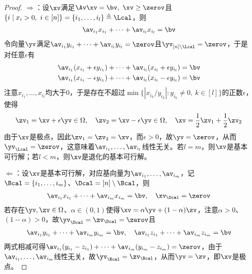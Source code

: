 \documentclass{ctexart}
\begin{document}
\begin{proof}
    $\Rightarrow$：设$\xv$满足$\Av \xv = \bv, ~ \xv \ge \zerov$且$\{ i \mid x_i > 0, ~ i \in [n] \} = \{ i_1, \ldots, i_l \} \triangleq \Lcal$，则
    \begin{align*}
        \av_{i_1} x_{i_1} + \cdots + \av_{i_l} x_{i_l} = \bv
    \end{align*}
    令向量$\yv$满足$\av_{i_1} y_{i_1} + \cdots + \av_{i_l} y_{i_l} = \zerov$且$\yv_{[n]\setminus \Lcal} = \zerov$，于是对任意$\epsilon$有
    \begin{align*}
        \av_{i_1} (x_{i_1} + \epsilon y_{i_1}) + \cdots + \av_{i_l} (x_{i_l} + \epsilon y_{i_l}) & = \bv \\
        \av_{i_1} (x_{i_1} - \epsilon y_{i_1}) + \cdots + \av_{i_l} (x_{i_l} - \epsilon y_{i_l}) & = \bv
    \end{align*}
    注意$x_{i_1}, \ldots, x_{i_l}$均大于$0$，于是存在不超过$\min\{ | x_{i_k} / y_{i_k} | : y_{i_k} \ne 0, ~ k \in [l] \}$的正数$\epsilon$，使得
    \begin{align*}
        \zv_1 = \xv + \epsilon \yv \in \Omega, \quad \zv_2 = \xv - \epsilon \yv \in \Omega, \quad \xv = \frac{1}{2} \zv_1 + \frac{1}{2} \zv_2
    \end{align*}
    由于$\xv$是极点，因此$\zv_1 = \zv_2 = \xv$，而$\epsilon > 0$，故$\yv = \zerov$，从而$\yv_\Lcal = \zerov$，这意味着$\av_{i_1}, \ldots, \av_{i_l}$线性无关。若$l = m$，则$\xv$是基本可行解；若$l < m$，则$\xv$是退化的基本可行解。

    $\Leftarrow$：设$\xv$是基本可行解，对应基向量为$\av_{i_1}, \ldots, \av_{i_m}$，记$\Bcal = \{i_1, \ldots, i_m\}$、$\Dcal = [n] \setminus \Bcal$，则
    \begin{align*}
        \av_{i_1} x_{i_1} + \cdots + \av_{i_m} x_{i_m} = \bv, \quad \xv_\Dcal = \zerov
    \end{align*}
    若存在$\yv, \zv \in \Omega$、$\alpha \in (0,1)$使得$\xv = \alpha \yv + (1 - \alpha)\zv$，注意$\alpha > 0$、$(1- \alpha) > 0$，故$\yv_\Dcal = \zv_\Dcal = \zerov$且
    \begin{align*}
        \av_{i_1} y_{i_1} + \cdots + \av_{i_m} y_{i_m} = \bv, \quad \av_{i_1} z_{i_1} + \cdots + \av_{i_m} z_{i_m} = \bv
    \end{align*}
    两式相减可得$\av_{i_1} (y_{i_1} - z_{i_1}) + \cdots + \av_{i_m} (y_{i_m} - z_{i_m}) = \zerov$，由于$\av_{i_1}, \ldots, \av_{i_m}$线性无关，故$\yv_\Bcal = \zv_\Bcal$，从而$\yv = \zv$，即$\xv$是极点。
\end{proof}
\end{document}

